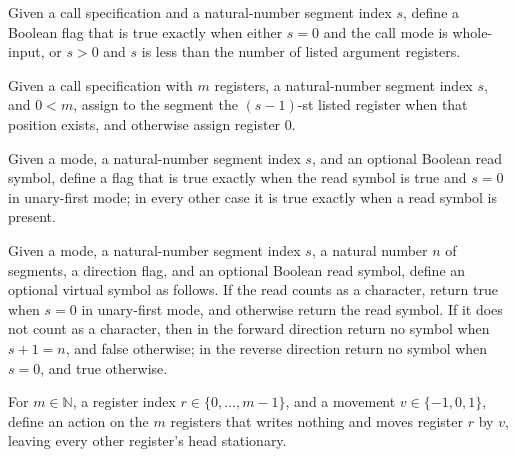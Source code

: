 \begin{definition}
\label{Complexity.LogProg.segDbl}
\leanok
{}
Given a call specification and a natural-number segment index $s$, define a Boolean flag
that is true exactly when either $s=0$ and the call mode is whole-input, or $s>0$ and
$s$ is less than the number of listed argument registers.
\end{definition}

\begin{definition}
\label{Complexity.LogProg.segReg}
\leanok
{}
Given a call specification with $m$ registers, a natural-number segment index $s$, and
$0<m$, assign to the segment the $(s-1)$-st listed register when that position exists,
and otherwise assign register $0$.
\end{definition}

\begin{definition}
\label{Complexity.LogProg.isCharRead}
\leanok
{}
Given a mode, a natural-number segment index $s$, and an optional Boolean read symbol,
define a flag that is true exactly when the read symbol is true and $s=0$ in unary-first
mode; in every other case it is true exactly when a read symbol is present.
\end{definition}

\begin{definition}
\label{Complexity.LogProg.virtSym}
\leanok
{}
Given a mode, a natural-number segment index $s$, a natural number $n$ of segments, a
direction flag, and an optional Boolean read symbol, define an optional virtual symbol
as follows. If the read counts as a character, return true when $s=0$ in unary-first
mode, and otherwise return the read symbol. If it does not count as a character, then in
the forward direction return no symbol when $s+1=n$, and false otherwise; in the reverse
direction return no symbol when $s=0$, and true otherwise.
\end{definition}

\begin{definition}
\label{Complexity.LogProg.regMove}
\leanok
For $m\in\mathbb{N}$, a register index $r\in\{0,\ldots,m-1\}$, and a movement
$v\in\{-1,0,1\}$, define an action on the $m$ registers that writes nothing and moves
register $r$ by $v$, leaving every other register’s head stationary.
\end{definition}

